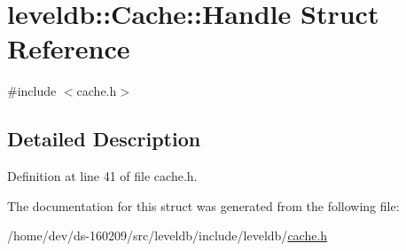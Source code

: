\hypertarget{structleveldb_1_1_cache_1_1_handle}{}\section{leveldb\+:\+:Cache\+:\+:Handle Struct Reference}
\label{structleveldb_1_1_cache_1_1_handle}


{\ttfamily \#include $<$cache.\+h$>$}



\subsection{Detailed Description}


Definition at line 41 of file cache.\+h.



The documentation for this struct was generated from the following file\+:\begin{DoxyCompactItemize}
\item 
/home/dev/ds-\/160209/src/leveldb/include/leveldb/\hyperlink{cache_8h}{cache.\+h}\end{DoxyCompactItemize}
